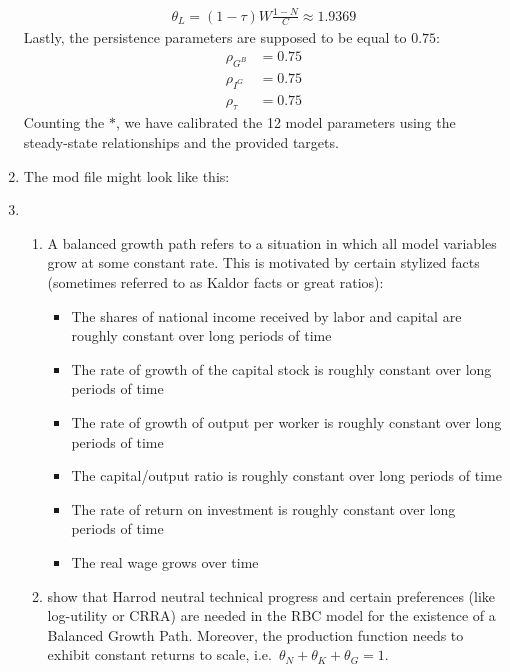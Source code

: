 \begin{enumerate}
\begin{align*}
\theta_L = (1-\tau) W \frac{1-N}{C} \approx 1.9369 \tag*{(*)}
\end{align*}
Lastly, the persistence parameters are supposed to be equal to \(0.75\):
\begin{align*}
\rho_{G^B} &= 0.75 \tag*{(*)}
\\
\rho_{I^G} &= 0.75 \tag*{(*)}
\\
\rho_{\tau} &= 0.75 \tag*{(*)}
\end{align*}
Counting the \(*\), we have calibrated the 12 model parameters using the steady-state relationships and the provided targets.

\item
The mod file might look like this:


\item 

\begin{enumerate}    
\item
A balanced growth path refers to a situation in which all model variables grow at some constant rate.
This is motivated by certain stylized facts (sometimes referred to as Kaldor facts or great ratios):
\begin{itemize}
\item The shares of national income received by labor and capital are roughly constant over long periods of time
\item The rate of growth of the capital stock is roughly constant over long periods of time
\item The rate of growth of output per worker is roughly constant over long periods of time
\item The capital/output ratio is roughly constant over long periods of time
\item The rate of return on investment is roughly constant over long periods of time
\item The real wage grows over time
\end{itemize}

\item
\textcite{King.Plosser.Rebelo_1988_ProductionGrowthBusiness} show that Harrod neutral technical progress
  and certain preferences (like log-utility or CRRA) are needed in the RBC model for the existence of a Balanced Growth Path.
Moreover, the production function needs to exhibit constant returns to scale, i.e.\
  \(\theta_N+\theta_K+\theta_G=1\).


\end{enumerate}
\end{enumerate}
